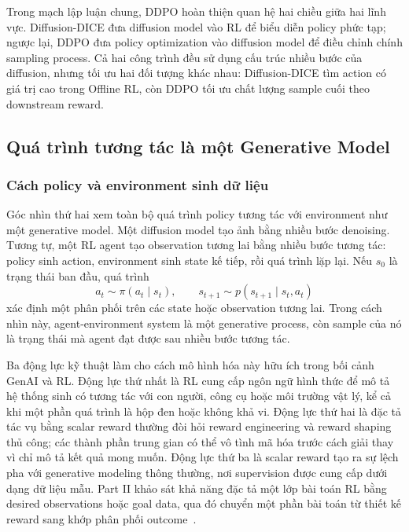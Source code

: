 Trong mạch lập luận chung, DDPO hoàn thiện quan hệ hai chiều giữa hai lĩnh vực.
Diffusion-DICE đưa diffusion model vào RL để biểu diễn policy phức tạp; ngược lại, DDPO đưa policy optimization vào diffusion model để điều chỉnh chính sampling process.
Cả hai công trình đều sử dụng cấu trúc nhiều bước của diffusion, nhưng tối ưu hai đối tượng khác nhau: Diffusion-DICE tìm action có giá trị cao trong Offline RL, còn DDPO tối ưu chất lượng sample cuối theo downstream reward.

\subsection{Quá trình tương tác là một Generative Model}

\subsubsection{Cách policy và environment sinh dữ liệu}

Góc nhìn thứ hai xem toàn bộ quá trình policy tương tác với environment như một generative model.
Một diffusion model tạo ảnh bằng nhiều bước denoising.
Tương tự, một RL agent tạo observation tương lai bằng nhiều bước tương tác: policy sinh action, environment sinh state kế tiếp, rồi quá trình lặp lại.
Nếu $s_0$ là trạng thái ban đầu, quá trình
\[
    a_t\sim\pi(a_t\mid s_t),
    \qquad
    s_{t+1}\sim p(s_{t+1}\mid s_t,a_t)
\]
xác định một phân phối trên các state hoặc observation tương lai.
Trong cách nhìn này, agent-environment system là một generative process, còn sample của nó là trạng thái mà agent đạt được sau nhiều bước tương tác.

Ba động lực kỹ thuật làm cho cách mô hình hóa này hữu ích trong bối cảnh GenAI và RL.
Động lực thứ nhất là RL cung cấp ngôn ngữ hình thức để mô tả hệ thống sinh có tương tác với con người, công cụ hoặc môi trường vật lý, kể cả khi một phần quá trình là hộp đen hoặc không khả vi.
Động lực thứ hai là đặc tả tác vụ bằng scalar reward thường đòi hỏi reward engineering và reward shaping thủ công; các thành phần trung gian có thể vô tình mã hóa trước cách giải thay vì chỉ mô tả kết quả mong muốn.
Động lực thứ ba là scalar reward tạo ra sự lệch pha với generative modeling thông thường, nơi supervision được cung cấp dưới dạng dữ liệu mẫu.
Part II khảo sát khả năng đặc tả một lớp bài toán RL bằng desired observations hoặc goal data, qua đó chuyển một phần bài toán từ thiết kế reward sang khớp phân phối outcome~\cite{eysenbach2025generativerl}.

